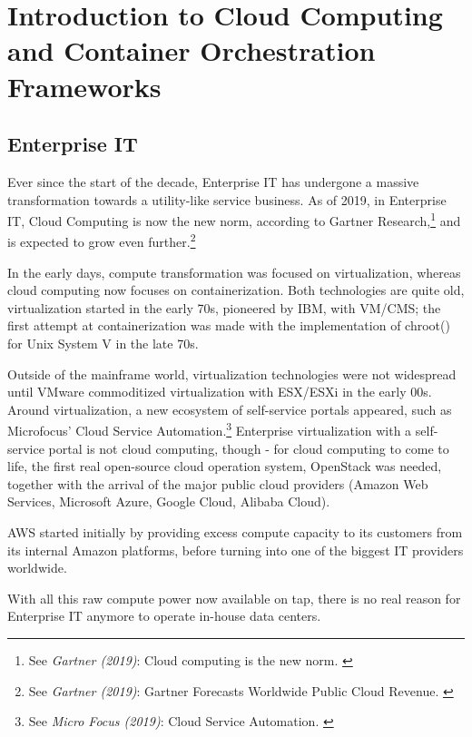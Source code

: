%
%

\pagebreak
\section{Introduction to Cloud Computing and Container Orchestration Frameworks}

\onehalfspacing

\subsection{Enterprise IT}

Ever since the start of the decade, Enterprise IT has undergone a massive transformation towards a utility-like service business. As of 2019, in Enterprise IT, Cloud Computing is now the new norm, according to Gartner Research,\footnote{See \textit{Gartner (2019)}: Cloud computing is the new norm. \cite{gartnerCloudStatement}} and is expected to grow even further.\footnote{See \textit{Gartner (2019)}: Gartner Forecasts Worldwide Public Cloud Revenue. \cite{gartnerForecast}}

In the early days, compute transformation was focused on virtualization, whereas cloud computing now focuses on containerization. Both technologies are quite old, virtualization started in the early 70s, pioneered by IBM, with VM/CMS; the first attempt at containerization was made with the implementation of chroot() for Unix System V in the late 70s.

Outside of the mainframe world, virtualization technologies were not widespread until VMware commoditized virtualization with ESX/ESXi in the early 00s. Around virtualization, a new ecosystem of self-service portals appeared, such as Microfocus' Cloud Service Automation.\footnote{See \textit{Micro Focus (2019)}: Cloud Service Automation. \cite{csaMF}} Enterprise virtualization with a self-service portal is not cloud computing, though - for cloud computing to come to life, the first real open-source cloud operation system, OpenStack was needed, together with the arrival of the major public cloud providers (Amazon Web Services, Microsoft Azure, Google Cloud, Alibaba Cloud).

AWS started initially by providing excess compute capacity to its customers from its internal Amazon platforms, before turning into one of the biggest IT providers worldwide.

With all this raw compute power now available on tap, there is no real reason for Enterprise IT anymore to operate in-house data centers.

